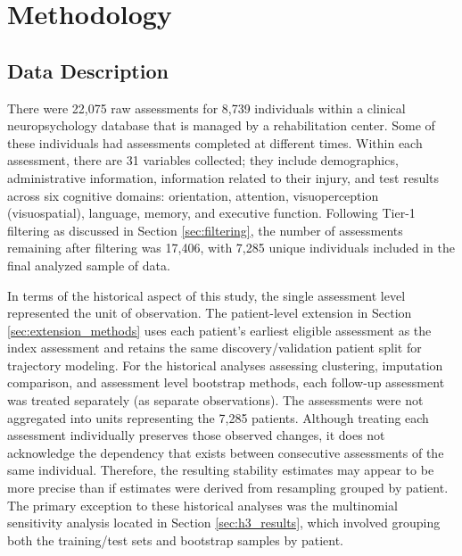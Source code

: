 
\chapter{Methodology}\label{Chapter3}


\section{Data Description}
There were 22,075 raw assessments for 8,739 individuals within a clinical neuropsychology database that is managed by a rehabilitation center. Some of these individuals had assessments completed at different times. Within each assessment, there are 31 variables collected; they include demographics, administrative information, information related to their injury, and test results across six cognitive domains: orientation, attention, visuoperception (visuospatial), language, memory, and executive function. Following Tier-1 filtering as discussed in Section \ref{sec:filtering}, the number of assessments remaining after filtering was 17,406, with 7,285 unique individuals included in the final analyzed sample of data.

In terms of the historical aspect of this study, the single assessment level represented the unit of observation. The patient-level extension in Section \ref{sec:extension_methods} uses each patient's earliest eligible assessment as the index assessment and retains the same discovery/validation patient split for trajectory modeling. For the historical analyses assessing clustering, imputation comparison, and assessment level bootstrap methods, each follow-up assessment was treated separately (as separate observations). The assessments were not aggregated into units representing the 7,285 patients. Although treating each assessment individually preserves those observed changes, it does not acknowledge the dependency that exists between consecutive assessments of the same individual. Therefore, the resulting stability estimates may appear to be more precise than if estimates were derived from resampling grouped by patient. The primary exception to these historical analyses was the multinomial sensitivity analysis located in Section \ref{sec:h3_results}, which involved grouping both the training/test sets and bootstrap samples by patient.

